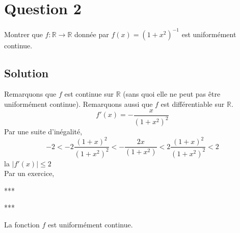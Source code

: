 \section*{Question 2}
	Montrer que $f:\mathbb{R}\longrightarrow\mathbb{R}$ donnée par $f(x)=(1+x^2)^{-1}$ est uniformément continue.
\subsection*{Solution}
Remarquons que $f$ est continue sur $\mathbb{R}$ (sans quoi elle ne peut pas être uniformément continue).
Remarquons aussi que $f$ est différentiable sur $\mathbb{R}$.
\[f'(x)=-\frac{x}{(1+x^2)^2}\]
Par une suite d'inégalité,
\[-2<-2\frac{(1+x)^2}{(1+x^2)^2}<-\frac{2x}{(1+x^2)}<2\frac{(1+x)^2}{(1+x^2)^2}<2\]
la $|f'(x)|\leq 2$\\
Par un exercice, 
\begin{center}
	***
\end{center}

\begin{center}
	***
\end{center}
La fonction $f$ est uniformément continue.